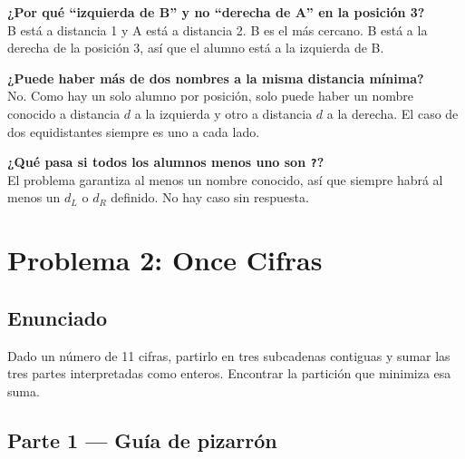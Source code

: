 \documentclass[12pt, oneside]{article}
\begin{document}
\begin{notaprofesor}
  \textbf{¿Por qué ``izquierda de B'' y no ``derecha de A'' en la posición 3?}\\
  B está a distancia 1 y A está a distancia 2.  B es el más cercano.
  B está a la derecha de la posición 3, así que el alumno está
  a la izquierda de B.

  \medskip
  \textbf{¿Puede haber más de dos nombres a la misma distancia mínima?}\\
  No.  Como hay un solo alumno por posición, solo puede haber un nombre
  conocido a distancia $d$ a la izquierda y otro a distancia $d$ a la
  derecha.  El caso de dos equidistantes siempre es uno a cada lado.

  \medskip
  \textbf{¿Qué pasa si todos los alumnos menos uno son \texttt{?}?}\\
  El problema garantiza al menos un nombre conocido, así que siempre
  habrá al menos un $d_L$ o $d_R$ definido.  No hay caso sin respuesta.
\end{notaprofesor}

\newpage

\section{Problema 2: Once Cifras}

\subsection{Enunciado}

Dado un número de 11 cifras, partirlo en tres subcadenas contiguas y
sumar las tres partes interpretadas como enteros.  Encontrar la partición
que minimiza esa suma.

\subsection{Parte 1 — Guía de pizarrón}
\end{document}

